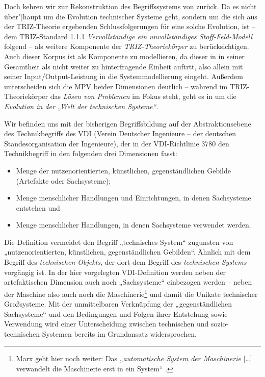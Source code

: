 \documentclass[12pt,a4paper]{article}
\begin{document}
Doch kehren wir zur Rekonstruktion des Begriffssystems von \cite{TESE2018}
zurück.  Da es nicht über"|haupt um die Evolution technischer Systeme geht,
sondern um die sich aus der TRIZ-Theorie ergebenden Schlussfolgerungen für
eine solche Evolution, ist -- dem TRIZ-Standard 1.1.1 \emph{Vervollständige
  ein unvollständiges Stoff-Feld-Modell} folgend -- als weitere Komponente der
\emph{TRIZ-Theoriekörper} zu berücksichtigen. Auch dieser Korpus ist als
Komponente zu modellieren, da dieser in \cite{TESE2018} in seiner Gesamtheit
als nicht weiter zu hinterfragende Einheit auftrtt, also allein mit seiner
Input/Output-Leistung in die Systemmodellierung eingeht.  Außerdem
unterscheiden sich die MPV beider Dimensionen deutlich -- während im
TRIZ-Theoriekörper das \emph{Lösen von Problemen} im Fokus steht, geht es in
\cite{TESE2018} um die \emph{Evolution in der „Welt der technischen Systeme“}.

Wir befinden uns mit der bisherigen Begriffsbildung auf der Abstraktionsebene
des Technikbegriffs des VDI (Verein Deutscher Ingenieure -- der deutschen
Standesorganisation der Ingenieure), der in der VDI-Richtlinie 3780 den
Technikbegriff in den folgenden drei Dimensionen fasst:
\begin{itemize}
\item Menge der nutzenorientierten, künstlichen, gegenständlichen Gebilde
  (Artefakte oder Sachsysteme);
\item Menge menschlicher Handlungen und Einrichtungen, in denen Sachsysteme
  entstehen und
\item Menge menschlicher Handlungen, in denen Sachsysteme verwendet werden.
\end{itemize}
Die Definition vermeidet den Begriff „technisches System“ zugunsten von
„nutzenorientierten, künstlichen, gegenständlichen Gebilden“. Ähnlich
\cite{Shpakovsky2003} mit dem Begriff des \emph{technischen Objekts}, der dort
dem Begriff des \emph{technischen Systems} vorgängig ist. In der hier
vorgelegten VDI-Definition werden neben der artefaktischen Dimension auch noch
„Sachsysteme“ einbezogen werden -- neben der Maschine also auch noch die
Maschinerie\footnote{Marx geht hier noch weiter: Das „\emph{automatische
    System der Maschinerie} [\ldots] verwandelt die Maschinerie erst in ein
  System“ \cite[S. 584]{MEW42}.} und damit die Unikate technischer
Großsysteme.  Mit der unmittelbaren Verknüpfung der „gegenständlichen
Sachsysteme“ und den Bedingungen und Folgen ihrer Entstehung sowie Verwendung
wird einer Unterscheidung zwischen technischen und sozio-technischen Systemen
bereits im Grundansatz widersprochen.
\end{document}

